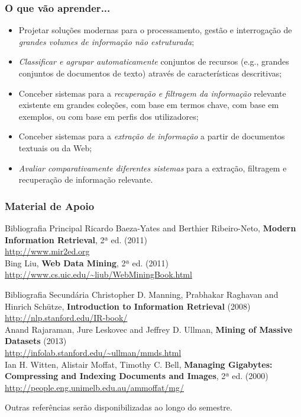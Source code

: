 \documentclass{beamer}
\begin{document}
\begin{frame} \frametitle{O que vão aprender...}
    \begin{itemize}
	\item Projetar soluções modernas para o processamento, gestão e interrogação de \emph{grandes volumes de informação não estruturada};
	\item \emph{Classificar e agrupar automaticamente} conjuntos de recursos (e.g., grandes conjuntos de documentos de texto) através de características descritivas;
	\item Conceber sistemas para a \emph{recuperação e filtragem da informação} relevante existente em grandes coleções, com base em termos chave, com base em exemplos, ou com base em perfis dos utilizadores;
	\item Conceber sistemas para a \emph{extração de informação} a partir de documentos textuais ou da Web;
	\item \emph{Avaliar comparativamente diferentes sistemas} para a extração, filtragem e recuperação de informação relevante.	
    \end{itemize}
\end{frame}

\begin{frame}
    \frametitle{Material de Apoio}
    \begin{block}{Bibliografia Principal}
        \scriptsize 
        Ricardo Baeza-Yates and Berthier Ribeiro-Neto, \textbf{Modern Information Retrieval}, 2ª ed. (2011)\\
        {\tiny\url{http://www.mir2ed.org}}\\[.5\baselineskip]

        Bing Liu, \textbf{Web Data Mining}, 2ª ed. (2011)\\
        {\tiny\url{http://www.cs.uic.edu/~liub/WebMiningBook.html}}
    \end{block}
    \begin{block}{Bibliografia Secundária}
        \scriptsize 
        Christopher D.  Manning, Prabhakar Raghavan and Hinrich Schütze,
        \textbf{Introduction to Information Retrieval} (2008)\\
        {\tiny\url{http://nlp.stanford.edu/IR-book/}}\\[.5\baselineskip]

        Anand Rajaraman, Jure Leskovec and Jeffrey D. Ullman, \textbf{Mining of Massive Datasets} (2013)\\
        {\tiny\url{http://infolab.stanford.edu/~ullman/mmds.html}}\\[.5\baselineskip]

        Ian H. Witten, Alistair Moffat, Timothy C. Bell, \textbf{Managing Gigabytes: Compressing and Indexing Documents and Images}, 2ª ed. (2000)\\
        {\tiny\url{http://people.eng.unimelb.edu.au/ammoffat/mg/}}
    \end{block}
    Outras referências serão disponibilizadas ao longo do semestre.
\end{frame}
\end{document}
